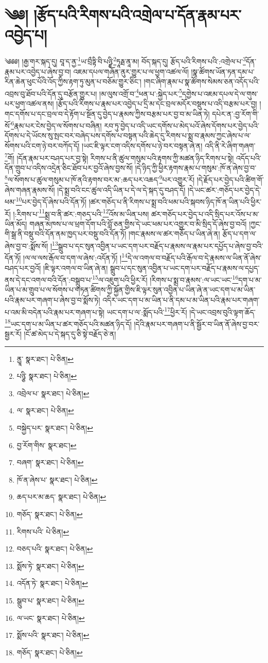 \setcounter{footnote}{0} 
\chapter{༄༅། །རྩོད་པའི་རིགས་པའི་འགྲེལ་པ་དོན་རྣམ་པར་འབྱེད་པ།}༄༅༅། །རྒྱ་གར་སྐད་དུ། བཱ་ད་ནྱ་\footnote{ནྱཱ་  སྣར་ཐང་།  པེ་ཅིན། }ཡ་བྲྀཏྟི་བི་པཉྫི་\footnote{པཉྩི་  སྣར་ཐང་།  པེ་ཅིན། }ཏཱརྠ་ནཱ་མ། བོད་སྐད་དུ། རྩོད་པའི་རིགས་པའི་:འགྲེལ་པ་\footnote{འབྲེལ་པ་  སྣར་ཐང་།  པེ་ཅིན། }དོན་རྣམ་པར་འབྱེད་པ་ཞེས་བྱ་བ། འཇམ་དཔལ་གཞོན་ནུར་གྱུར་པ་ལ་ཕྱག་འཚལ་ལོ། །སྣ་ཚོགས་ཡོན་ཏན་དམ་པ་རིན་ཆེན་ཕུང་པོའི་འོད་ཀྱིས་རྟག་ཏུ་མུན་པ་བཅོམ་གྱུར་ཅིང་། །གང་ཞིག་རྣམ་པ་སྣ་ཚོགས་སེམས་ཅན་འདོད་པའི་འབྲས་བུ་ཐོབ་པའི་དོན་དུ་བརྩོན་གྱུར་པ། །མ་ལུས་འགྲོ་བ་\footnote{ལ་  སྣར་ཐང་།  པེ་ཅིན། }ཕན་པ་:སྐྱེད་པར་\footnote{བསྐྱེད་པར་  སྣར་ཐང་།  པེ་ཅིན། }དགྱེས་པ་འཇམ་དཔལ་དེ་ལ་གུས་པར་ཕྱག་འཚལ་ནས། །རྩོད་པའི་རིགས་པ་རྣམ་པར་འབྱེད་པ་དྲི་མ་དང་བྲལ་མདོར་བསྡུས་པ་འདི་བརྩམ་པར་བྱ། །གང་དགོས་པ་དང་བྲལ་བ་དེ་རྟོག་པ་སྔོན་དུ་བྱེད་པ་རྣམས་ཀྱིས་བརྩམ་པར་བྱ་བ་མ་ཡིན་ཏེ། དཔེར་ན་:བྱ་རོག་གི་སོ་\footnote{བྱ་རོག་གིས་  སྣར་ཐང་། }རྣམ་པར་ངེས་བྱེད་ལ་སོགས་པ་བཞིན། རབ་ཏུ་བྱེད་པ་འདི་ཡང་དགོས་པ་མེད་པའོ་ཞེས་དོགས་པར་བྱེད་པའི་དོགས་པ་དེ་ཡོངས་སུ་སྤང་བར་བཞེད་པས་དགོས་པ་བསྟན་པའི་ཆེད་དུ་རིགས་པ་སྨྲ་བ་རྣམས་ཀྱང་ཞེས་པ་ལ་སོགས་པའི་ངག་ཉེ་བར་བཀོད་དོ། །ཡང་ཇི་ལྟར་ངག་འདིས་དགོས་པ་ཉེ་བར་བསྟན་ཞེ་ན། འདི་ནི་རེ་ཞིག་གཞག་\footnote{བཞག་  སྣར་ཐང་།  པེ་ཅིན། }གོ། །དོན་རྣམ་པར་བཤད་པར་བྱ་སྟེ། རིགས་པ་ནི་ཚུལ་གསུམ་པའི་རྟགས་ཀྱི་མཚན་ཉིད་རིགས་པ་སྟེ། འདོད་པའི་དོན་གྲུབ་པ་འདིས་འདྲེན་ཅིང་ཐོབ་པར་བྱའོ་ཞེས་བྱས་སོ། །དེ་ཉིད་ཀྱི་ཕྱིར་རྟགས་རྣམ་པ་གསུམ་:ཁོ་ན་ཞེས་བྱ་བ་\footnote{ཁོ་ན་ཞེས་པ་  སྣར་ཐང་།  པེ་ཅིན། }ལ་སོགས་པ་ཚུལ་གསུམ་པ་ཁོ་ནའི་རྟགས་བར་མ་:ཆད་པར་འཆད་\footnote{ཆད་པར་མ་ཆད་  སྣར་ཐང་།  པེ་ཅིན། }པར་འགྱུར་རོ། །དེ་རྗོད་པར་བྱེད་པའི་ཚིག་གོ་ཞེས་གཞན་རྣམས་སོ། །དེ་སྨྲ་བའི་ངང་ཚུལ་འདི་ཡིན་པ་དེ་ལ་དེ་སྐད་དུ་བཤད་དོ། །དེ་ཡང་ཚར་:གཅོད་པར་བྱེད་དེ་ཕམ་\footnote{གཅོད་  སྣར་ཐང་།  པེ་ཅིན། }པར་བྱེད་དོ་ཞེས་པའི་དོན་ཏོ། །ཚར་གཅོད་པ་ནི་རིགས་པ་སྨྲ་བའི་ཕམ་པའི་སྐབས་ཉིད་ཁོ་ན་ཡིན་པའི་ཕྱིར་རོ། །:རིགས་པ་\footnote{རིགས་པའི་  པེ་ཅིན། }སྨྲ་བ་ནི་ཚར་:གཅད་པའི་\footnote{བཅད་པའི་  སྣར་ཐང་།  པེ་ཅིན། }འོས་མ་ཡིན་པས། ཚར་གཅོད་པར་བྱེད་པ་འདི་སྲིད་པར་འོས་པ་མ་ཡིན་མོད། གཞན་མཁས་པ་ལ་ཕྲག་དོག་པའི་བློ་ཅན་གྱིས་དེ་ཡང་ཕམ་པར་འགྱུར་བ་མི་སྲིད་དོ་ཞེས་བྱ་བའོ། །ཀྱང་གི་སྒྲ་ནི་བསྡུ་བའི་དོན་ནམ་ཁྱད་པར་བསྡུ་བའི་དོན་ཏོ། །གང་རྣམས་ལ་ཚར་གཅོད་པ་ཡིན་ཞེ་ན། རྩོད་པ་དག་ལ་ཞེས་བྱ་བ་:སྨོས་སོ། །\footnote{སྨོས་ཏེ་  སྣར་ཐང་།  པེ་ཅིན། }སྒྲུབ་པ་དང་སུན་འབྱིན་པ་ཡང་དག་པར་བརྗོད་པ་རྣམས་ལ་རྣམ་པར་དཔྱོད་པ་ཞེས་བྱ་བའི་དོན་ཏོ། །ལ་ལ་ལས་རྒོལ་བ་དག་ལ་ཞེས་:འདོན་ཏོ། །\footnote{འདོན་ཏེ་  སྣར་ཐང་།  པེ་ཅིན། }དེ་ལ་འགལ་བ་བརྗོད་པའི་རྒོལ་བ་དེ་རྣམས་ལ་ཡིན་ནོ་ཞེས་བཤད་པར་བྱའོ། །ཇི་ལྟར་འགལ་བ་ཡིན་ཞེ་ན། སྒྲུབ་པ་དང་སུན་འབྱིན་པ་ཡང་དག་པར་བརྗོད་པ་རྣམས་ལ་དཔྱད་ནས་དེ་དང་འགལ་བའི་དོན་:བསྒྲུབ་པ་\footnote{སྒྲུབ་པ་  སྣར་ཐང་།  པེ་ཅིན། }ལ་འཇུག་པའི་ཕྱིར་རོ། །རིགས་པ་སྨྲ་བ་རྣམས་:ལ་ཡང་ཡང་\footnote{ལ་ཡང་  སྣར་ཐང་།  པེ་ཅིན། }དག་པ་མ་ཡིན་པ་མ་གྲུབ་པ་ལ་སོགས་པ་གཏན་ཚིགས་ཀྱི་སྐྱོན་གྱིས་ཇི་ལྟར་སུན་འབྱིན་པ་ཡིན་ཞེ་ན་ཡང་དག་པ་མ་ཡིན་པའི་རྣམ་པར་གཞག་པ་ཞེས་བྱ་བ་སྨོས་ཏེ། འདིར་ཡང་དག་པ་མ་ཡིན་པ་ནི་དམ་པ་མ་ཡིན་པའི་རྣམ་པར་གཞག་པ་འམ་མི་བདེན་པའི་རྣམ་པར་གཞག་པ་སྟེ། ཡང་དག་པ་ལ་:སྨོད་པའི་\footnote{སྨོས་པའི་  སྣར་ཐང་།  པེ་ཅིན། }ཕྱིར་རོ། །དེ་ཡང་འབྲས་བུའི་ལྟག་ཆོད་\footnote{གཅོད་  སྣར་ཐང་།  པེ་ཅིན། }ཡང་དག་པ་མ་ཡིན་པ་ཚར་གཅོད་པའི་མཚན་ཉིད་དོ། །དེའི་རྣམ་པར་གཞག་པ་ནི་སྦྱོར་བ་ཡིན་ནོ་ཞེས་བྱ་བར་སྦྱར་རོ། །ངོ་ཚ་མེད་པ་དེ་སྐད་དུ་ཅི་སྟེ་བརྗོད་ཅེ་ན། 